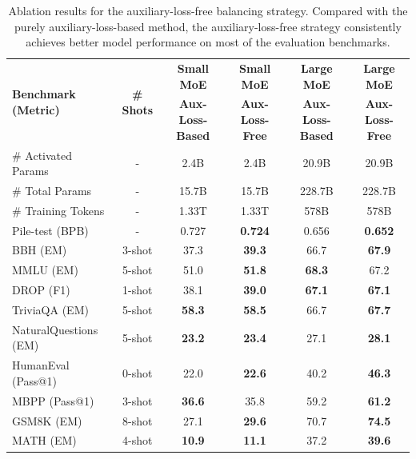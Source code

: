 \documentclass[11pt, a4paper, logo, copyright, nonumbering]{deepseek}
\begin{document}
\begin{CJK*}{UTF8}{gbsn}
\begin{table}[t]
    \centering
    \footnotesize
    \setlength{\tabcolsep}{4pt}
    \begin{tabular}{@{}l c | c c | c c@{}}
    \toprule
    \multirow{2}{*}{\centering \textbf{Benchmark (Metric)}} & \multirow{2}{*}{\textbf{\# Shots}} & \textbf{Small MoE} & \textbf{Small MoE} & \textbf{Large MoE} & \textbf{Large MoE} \\
     & & \textbf{Aux-Loss-Based} & \textbf{Aux-Loss-Free} & \textbf{Aux-Loss-Based} & \textbf{Aux-Loss-Free} \\
    \midrule
    \# Activated Params & - & 2.4B & 2.4B & 20.9B & 20.9B \\
    \# Total Params & - & 15.7B & 15.7B & 228.7B & 228.7B \\
    \# Training Tokens & - & 1.33T & 1.33T & 578B & 578B \\
    \midrule
    Pile-test {\tiny (BPB)} & - & 0.727 & \textbf{0.724} & 0.656 & \textbf{0.652} \\
    BBH {\tiny (EM)} & 3-shot & 37.3 & \textbf{39.3} & 66.7 & \textbf{67.9} \\
    MMLU {\tiny (EM)} & 5-shot & 51.0 & \textbf{51.8} & \textbf{68.3} & 67.2 \\
    DROP {\tiny (F1)} & 1-shot & 38.1 & \textbf{39.0} & \textbf{67.1} & \textbf{67.1} \\
    TriviaQA {\tiny (EM)} & 5-shot & \textbf{58.3} & \textbf{58.5} & 66.7 & \textbf{67.7} \\
    NaturalQuestions {\tiny (EM)} & 5-shot & \textbf{23.2} & \textbf{23.4} & 27.1 & \textbf{28.1} \\
    HumanEval {\tiny (Pass@1)} & 0-shot & 22.0 & \textbf{22.6} & 40.2 & \textbf{46.3} \\
    MBPP {\tiny (Pass@1)} & 3-shot & \textbf{36.6} & 35.8 & 59.2 & \textbf{61.2} \\
    GSM8K {\tiny (EM)} & 8-shot & 27.1 & \textbf{29.6} & 70.7 & \textbf{74.5} \\
    MATH {\tiny (EM)} & 4-shot & \textbf{10.9} & \textbf{11.1} & 37.2 & \textbf{39.6} \\
    \bottomrule
    \end{tabular}
    \caption{
    Ablation results for the auxiliary-loss-free balancing strategy. 
    Compared with the purely auxiliary-loss-based method, the auxiliary-loss-free strategy consistently achieves better model performance on most of the evaluation benchmarks.
    }
    \label{tab:ablation_noaux_tc}
\end{table}


\end{CJK*}
\end{document}
